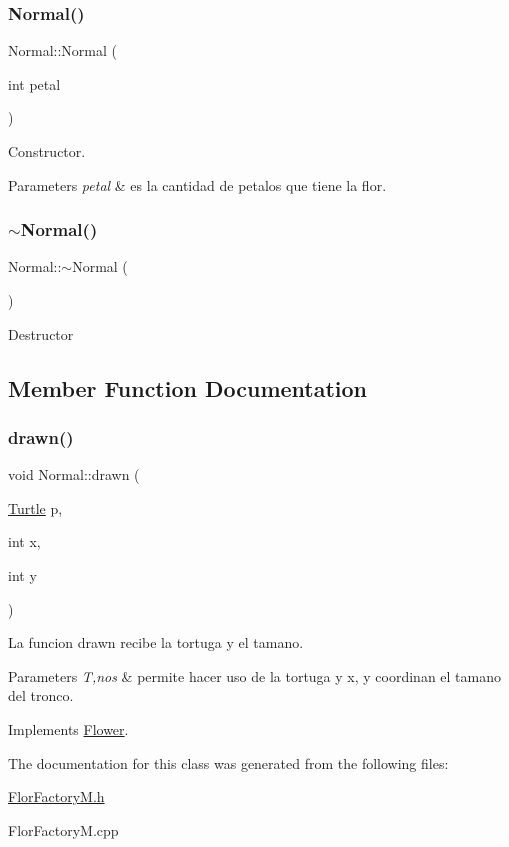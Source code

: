 \subsubsection{\texorpdfstring{Normal()}{Normal()}}
{\footnotesize\ttfamily Normal\+::\+Normal (\begin{DoxyParamCaption}\item[{int}]{petal }\end{DoxyParamCaption})}

Constructor. 
\begin{DoxyParams}{Parameters}
{\em petal} & es la cantidad de petalos que tiene la flor. \\
\hline
\end{DoxyParams}
\mbox{\label{classNormal_a2ed547e3b7361c3675224d352cf79740}} 
\subsubsection{\texorpdfstring{$\sim$\+Normal()}{~Normal()}}
{\footnotesize\ttfamily Normal\+::$\sim$\+Normal (\begin{DoxyParamCaption}{ }\end{DoxyParamCaption})}

Destructor 

\subsection{Member Function Documentation}
\mbox{\label{classNormal_aa47b10eb6a4ae2cfceb2b4d234c5ca26}} 
\subsubsection{\texorpdfstring{drawn()}{drawn()}}
{\footnotesize\ttfamily void Normal\+::drawn (\begin{DoxyParamCaption}\item[{\hyperlink{classTurtle}{Turtle}}]{p,  }\item[{int}]{x,  }\item[{int}]{y }\end{DoxyParamCaption})\hspace{0.3cm}{\ttfamily [virtual]}}

La funcion drawn recibe la tortuga y el tamano. 
\begin{DoxyParams}{Parameters}
{\em T,nos} & permite hacer uso de la tortuga y x, y coordinan el tamano del tronco. \\
\hline
\end{DoxyParams}


Implements \hyperlink{classFlower_af01eea570f9d02e16cda1d86ee97633c}{Flower}.



The documentation for this class was generated from the following files\+:\begin{DoxyCompactItemize}
\item 
\hyperlink{FlorFactoryM_8h}{Flor\+Factory\+M.\+h}\item 
Flor\+Factory\+M.\+cpp\end{DoxyCompactItemize}

